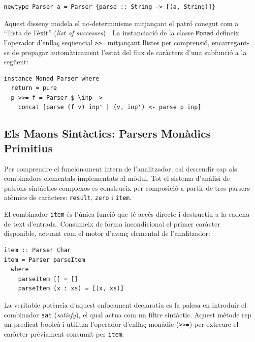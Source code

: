 \begin{lstlisting}[style=haskellstyle, caption=Definició monàdica del tipus Parser]
newtype Parser a = Parser {parse :: String -> [(a, String)]}
\end{lstlisting}

Aquest disseny modela el no-determinisme mitjançant el patró conegut com a ``llista de l'èxit'' (\textit{list of successes}) \cite{wadler1992essence}. La instanciació de la classe \texttt{Monad} defineix l'operador d'enllaç seqüencial \texttt{>>=} mitjançant llistes per comprensió, encarregant-se de propagar automàticament l'estat del flux de caràcters d'una subfunció a la següent:

\begin{lstlisting}[style=haskellstyle, caption=Instanciació de la infraestructura de classes de tipus per al Parser]
instance Monad Parser where
  return = pure
  p >>= f = Parser $ \inp ->
    concat [parse (f v) inp' | (v, inp') <- parse p inp]
\end{lstlisting}

\subsection{Els Maons Sintàctics: Parsers Monàdics Primitius}
Per comprendre el funcionament intern de l'analitzador, cal descendir cap als combinadors elementals implementats al mòdul. Tot el sistema d'anàlisi de patrons sintàctics complexos es construeix per composició a partir de tres parsers atòmics de caràcters: \texttt{result}, \texttt{zero} i \texttt{item}.

El combinador \texttt{item} és l'única funció que té accés directe i destructiu a la cadena de text d'entrada. Consumeix de forma incondicional el primer caràcter disponible, actuant com el motor d'avanç elemental de l'analitzador:

\begin{lstlisting}[style=haskellstyle, caption=Implementació de la primitiva elemental item]
item :: Parser Char
item = Parser parseItem
  where
    parseItem [] = []
    parseItem (x : xs) = [(x, xs)]
\end{lstlisting}

La veritable potència d'aquest enfocament declaratiu es fa palesa en introduir el combinador \texttt{sat} (\textit{satisfy}), el qual actua com un filtre sintàctic. Aquest mètode rep un predicat booleà i utilitza l'operador d'enllaç monàdic (\texttt{>>=}) per extreure el caràcter prèviament consumit per \texttt{item}:

